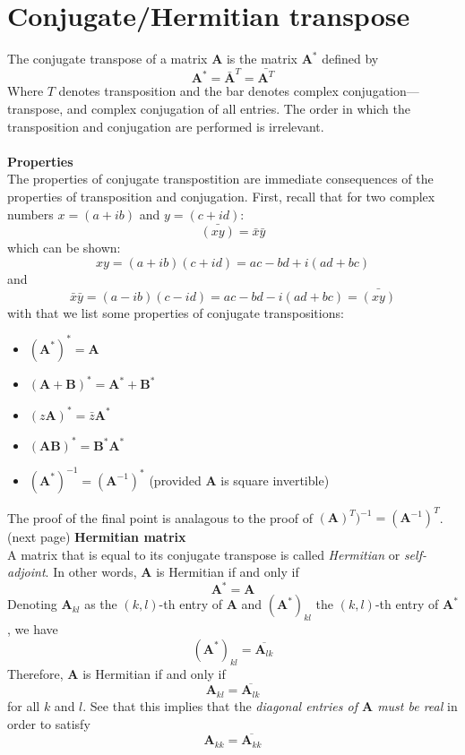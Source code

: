 \documentclass{report}
\begin{document}
\section{Conjugate/Hermitian transpose}
The conjugate transpose of a matrix $\bm A$ is the matrix $\bm A^*$
defined by
\begin{equation*}
\bm A^*=\bar{\bm{A}}^T=\bar{\bm{A}^T}
\end{equation*}
Where $T$ denotes transposition and the bar denotes complex conjugation---transpose, and complex conjugation of all entries. The order in which the
transposition and conjugation are performed is irrelevant.\\
\vspace{1mm}\\
\textbf{Properties}\\
The properties of conjugate transpostition are immediate consequences of the properties of transposition and conjugation. First, recall that
for two complex numbers $x=(a+ib)$ and $y=(c+id)$:
\begin{equation*}
\bar{(xy)}=\bar x \bar y
\end{equation*}
which can be shown:
\begin{equation*}
xy=(a+ib)(c+id)=ac-bd+i(ad+bc)
\end{equation*}
and
\begin{equation*}
\bar x\bar y=(a-ib)(c-id)=ac-bd-i(ad+bc)=\bar{(xy)}
\end{equation*}
with that we list some properties of conjugate transpositions:
\begin{itemize}
\item $(\bm A^*)^*=\bm A$
\item $(\bm A+\bm B)^*=\bm A^*+\bm B^*$
\item $(z\bm A)^*=\bar z\bm A^*$
\item $(\bm{AB})^*=\bm B^*\bm A^*$
\item $(\bm A^*)^{-1}=(\bm A^{-1})^*$ (provided $\bm A$ is square invertible)
\end{itemize}
The proof of the final point is analagous to the proof of $(\bm{A})^T)^{-1}=(\bm{A}^{-1})^T$.\\
(next page)\newpage
\noindent\textbf{Hermitian matrix}\\
A matrix that is equal to its conjugate transpose is called \textit{Hermitian} or \textit{self-adjoint}. In other words, $\bm A$ is Hermitian if 
and only if
\begin{equation*}
\bm A^*=\bm A
\end{equation*}
Denoting $\bm A_{kl}$ as the $(k,l)$-th entry of $\bm A$ and $(\bm A^*)_{kl}$ the $(k,l)$-th entry of $\bm A^*$, we have
\begin{equation*}
(\bm A^*)_{kl}=\overline{\bm A_{lk}}
\end{equation*}
Therefore, $\bm A$ is Hermitian if and only if
\begin{equation*}
\bm A_{kl}=\overline{\bm A_{lk}}
\end{equation*}
for all $k$ and $l$. See that this implies that the \textit{diagonal entries of $\bm A$ must be real} in order to satisfy
\begin{equation*}
\bm A_{kk}=\overline{\bm A_{kk}}
\end{equation*}
\newpage

\section{}
\end{document}
